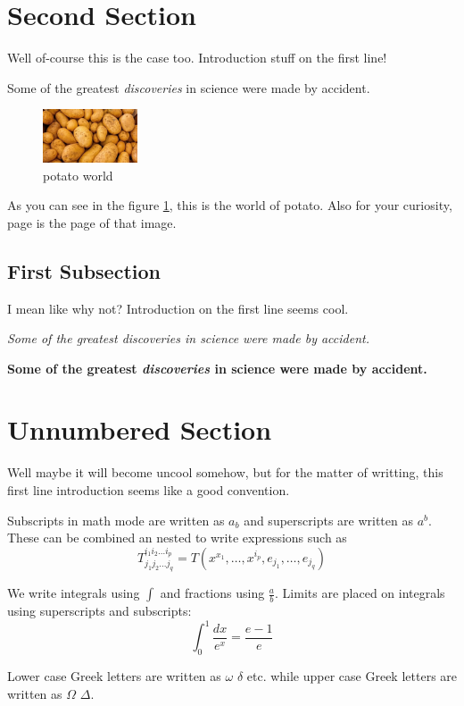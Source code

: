 \documentclass[12pt, letterpaper, oneside]{report}
\begin{document}
\section{Second Section}
Well of-course this is the case too. Introduction stuff on the first line!

Some of the greatest \emph{discoveries}
in science were made by accident.

\begin{figure}[h]
    \centering
    \includegraphics[width=0.25\textwidth]{potato}
    \caption{potato world}
    \label{bar}
\end{figure}

As you can see in the figure \ref{bar}, this is the world of potato. Also for your curiosity, page \pageref{bar} is the page of that image.

\subsection{First Subsection}
I mean like why not? Introduction on the first line seems cool.

\textit{Some of the greatest \emph{discoveries}
in science were made by accident.}

\textbf{Some of the greatest \emph{discoveries}
in science were made by accident.}

\section*{Unnumbered Section}
Well maybe it will become uncool somehow, but for the matter of writting, this first line introduction seems like a good convention.

Subscripts in math mode are written as $a_b$ and superscripts are written as $a^b$. These can be combined an nested to write expressions such as
\[ T^{i_1 i_2 \dots i_p}_{j_1 j_2 \dots j_q} =
T( x^{x_1}, \dots, x^{i_p}, e_{j_1}, \dots, e_{j_q} ) \]

We write integrals using $\int$ and fractions using $\frac{a}{b}$. Limits are placed on integrals using superscripts and subscripts:
\[ \int_0^1 \frac{dx}{e^x} = \frac{e - 1}{e} \]

Lower case Greek letters are written as $\omega$ $\delta$ etc. while upper case Greek letters are written as $\Omega$ $\Delta$.
\end{document}
